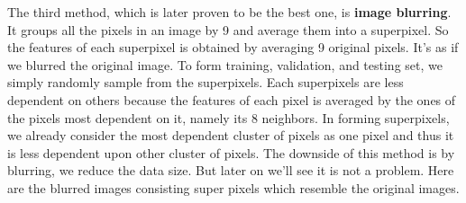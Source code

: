 \documentclass[jou]{apa}%
\begin{document}
\indent The third method, which is later proven to be the best one, is \textbf{image blurring}. It groups all the pixels in an image by 9 and average them into a superpixel. So the features of each superpixel is obtained by averaging 9 original pixels. It's as if we blurred the original image. To form training, validation, and testing set, we simply randomly sample from the superpixels. Each superpixels are less dependent on others because the features of each pixel is averaged by the ones of the pixels most dependent on it, namely its 8 neighbors. In forming superpixels, we already consider the most dependent cluster of pixels as one pixel and thus it is less dependent upon other cluster of pixels. The downside of this method is by blurring, we reduce the data size. But later on we'll see it is not a problem. Here are the blurred images consisting super pixels which resemble the original images.
\end{document}
